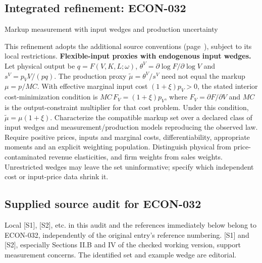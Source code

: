\documentclass[11pt,a4paper]{article}
\begin{document}
\subsection*{Integrated refinement: ECON-032}
{\sffamily\small\color{muted}Markup measurement with input wedges and production uncertainty\par}
This refinement adopts the additional source conventions
(page~\pageref{audited:conventions}), subject to its local restrictions.
\textbf{Flexible-input proxies with endogenous input wedges.}
Let physical output be $q=F(V,K,L;\omega)$,
$\theta^V=\partial\log F/\partial\log V$ and $s^V=p_VV/(pq)$.
The production proxy $\widetilde\mu=\theta^V/s^V$ need not equal
the markup $\mu=p/MC$. With effective marginal input cost $(1+\xi)p_V>0$,
the stated interior cost-minimization condition is
$MC\,F_V=(1+\xi)p_V$, where $F_V=\partial F/\partial V$
and $MC$ is the output-constraint multiplier for that cost problem.
Under this condition,
$\widetilde\mu=\mu(1+\xi)$. Characterize the compatible markup set over a declared
class of input wedges and measurement/production models reproducing the observed
law. Require positive prices, inputs and marginal costs, differentiability,
appropriate moments and an explicit weighting population. Distinguish physical
from price-contaminated revenue elasticities, and firm weights from sales weights.
Unrestricted wedges may leave the set uninformative; specify which independent
cost or input-price data shrink it.
\subsection*{Supplied source audit for ECON-032}
Local [S1], [S2], etc. in this audit and the references immediately below
belong to ECON-032, independently of the original entry's reference numbering.
[S1] and [S2], especially Sections II.B and IV of the checked working version, support measurement concerns. The identified set and example wedge are editorial.
\end{document}
